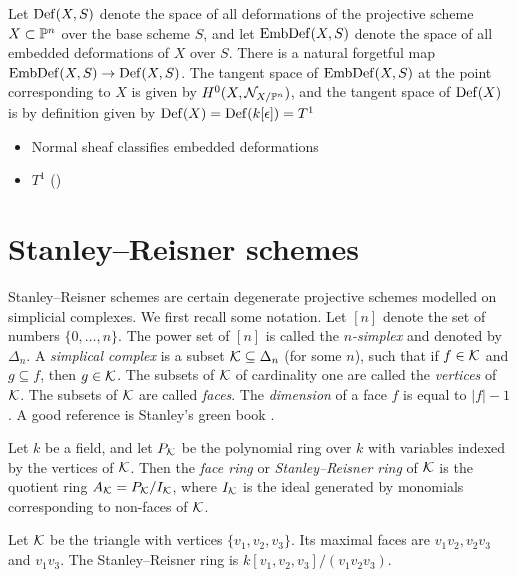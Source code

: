 Let $\Def(X,S)$ denote the space of all deformations of the projective scheme $X \subset \P^n$ over the base scheme $S$, and let $\EmbDef(X,S)$ denote the space of all embedded deformations of $X$ over $S$. There is a natural forgetful map $\EmbDef(X,S) \to \Def(X,S)$. The tangent space of $\EmbDef(X,S)$ at the point corresponding to $X$ is given by $H^0(X,\mathcal N_{X/\P^n})$, and the tangent space of $\Def(X)$ is by definition given by $\Def(X)=\Def(k[\epsilon])=T^1$ 



\begin{itemize}
	\item Normal sheaf classifies embedded deformations
	\item $T^1$ ()
\end{itemize}



\section{Stanley--Reisner schemes}

Stanley--Reisner schemes are certain degenerate projective schemes modelled on simplicial complexes. We first recall some notation.  Let $[n]$ denote the set of numbers $\{0,\ldots,n \}$. The power set of $[n]$ is called the \emph{$n$-simplex} and denoted by $\Delta_n$. A \emph{simplical complex} is a subset $\K \subseteq \Delta_n$ (for some $n$), such that if $f \in \K$ and $g \subseteq f$, then $g \in \K$. The subsets of $\K$ of cardinality one are called the \emph{vertices} of $\K$. The subsets of $\K$ are called \emph{faces}. The \emph{dimension} of a face $f$ is equal to $|f| - 1$. A good reference is Stanley's green book \cite{stanley_green}.

Let $k$ be a field, and let $P_\K$ be the polynomial ring over $k$ with variables indexed by the vertices of $\K$. Then the \emph{face ring} or \emph{Stanley--Reisner ring} of $\K$ is the quotient ring $A_\K = P_\K/I_\K$, where $I_\K$ is the ideal generated by monomials corresponding to non-faces of $\K$. 

\begin{example}
Let $\K$ be the triangle with vertices $\{ v_1,v_2,v_3\}$. Its maximal faces are $v_1v_2, v_2v_3$ and $v_1v_3$. The Stanley--Reisner ring is $k[v_1,v_2,v_3]/(v_1v_2v_3)$.
\end{example}


